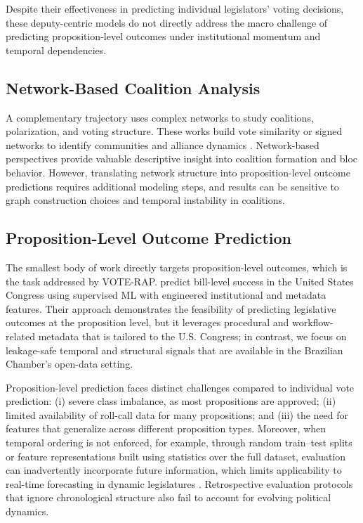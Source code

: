 \documentclass[review]{elsarticle}
\begin{document}
Despite their effectiveness in predicting individual legislators' voting decisions, these deputy-centric models do not directly address the macro challenge of predicting proposition-level outcomes under institutional momentum and temporal dependencies.

\subsection{Network-Based Coalition Analysis}

A complementary trajectory uses complex networks to study coalitions, polarization, and voting structure. These works build vote similarity or signed networks to identify communities and alliance dynamics \citep{Brito2020,Ferreira2021,Cherepnalkoski2022,Arinik2020,Silva2025SBSI}. Network-based perspectives provide valuable descriptive insight into coalition formation and bloc behavior. However, translating network structure into proposition-level outcome predictions requires additional modeling steps, and results can be sensitive to graph construction choices and temporal instability in coalitions.


\subsection{Proposition-Level Outcome Prediction}

The smallest body of work directly targets proposition-level outcomes, which is the task addressed by VOTE-RAP. \citet{Bari2021AIBillPassageUS} predict bill-level success in the United States Congress using supervised ML with engineered institutional and metadata features. Their approach demonstrates the feasibility of predicting legislative outcomes at the proposition level, but it leverages procedural and workflow-related metadata that is tailored to the U.S. Congress; in contrast, we focus on leakage-safe temporal and structural signals that are available in the Brazilian Chamber’s open-data setting.

Proposition-level prediction faces distinct challenges compared to individual vote prediction: (i) severe class imbalance, as most propositions are approved; (ii) limited availability of roll-call data for many propositions; and (iii) the need for features that generalize across different proposition types. Moreover, when temporal ordering is not enforced, for example, through random train--test splits or feature representations built using statistics over the full dataset, evaluation can inadvertently incorporate future information, which limits applicability to real-time forecasting in dynamic legislatures \citep{Patil2020,Kraft2021,Viola2022DataCentricBrazil}. Retrospective evaluation protocols that ignore chronological structure also fail to account for evolving political dynamics.
\end{document}
